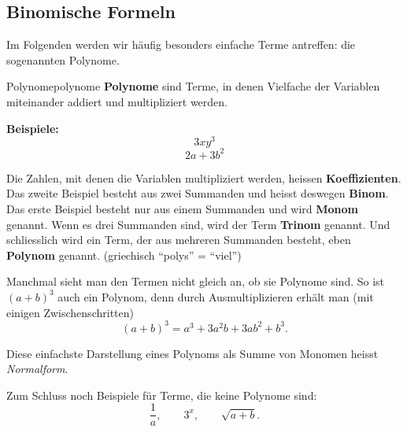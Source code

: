 
\subsection{Binomische Formeln}
Im Folgenden werden wir häufig besonders einfache Terme antreffen: die sogenannten Polynome.

\begin{definition}{Polynome}{polynome}
    \textbf{Polynome} sind Terme, in denen Vielfache der Variablen miteinander addiert und multipliziert werden.
\end{definition}

\textbf{Beispiele:}
\[
    3xy^3
\]
\[
    2a+3b^2
\]

Die Zahlen, mit denen die Variablen multipliziert werden, heissen \textbf{Koeffizienten}. Das zweite Beispiel besteht aus zwei Summanden und heisst deswegen \textbf{Binom}. Das erste Beispiel besteht nur aus einem Summanden und wird \textbf{Monom} genannt. Wenn es drei Summanden sind, wird der Term \textbf{Trinom} genannt. Und schliesslich wird ein Term, der aus mehreren Summanden besteht, eben \textbf{Polynom} genannt. (griechisch \enquote{polys} = \enquote{viel})

Manchmal sieht man den Termen nicht gleich an, ob sie Polynome sind. So ist \((a+b)^3\) auch ein Polynom, denn durch Ausmultiplizieren erhält man (mit einigen Zwischenschritten)
\[
    (a+b)^3=a^3+3a^2b+3ab^2+b^3.
\]

Diese einfachste Darstellung eines Polynoms als Summe von Monomen heisst \textit{Normalform}.

Zum Schluss noch Beispiele für Terme, die keine Polynome sind:
\[
    \frac{1}{a},
    \qquad
    3^x,
    \qquad
    \sqrt{a+b}.
\]

